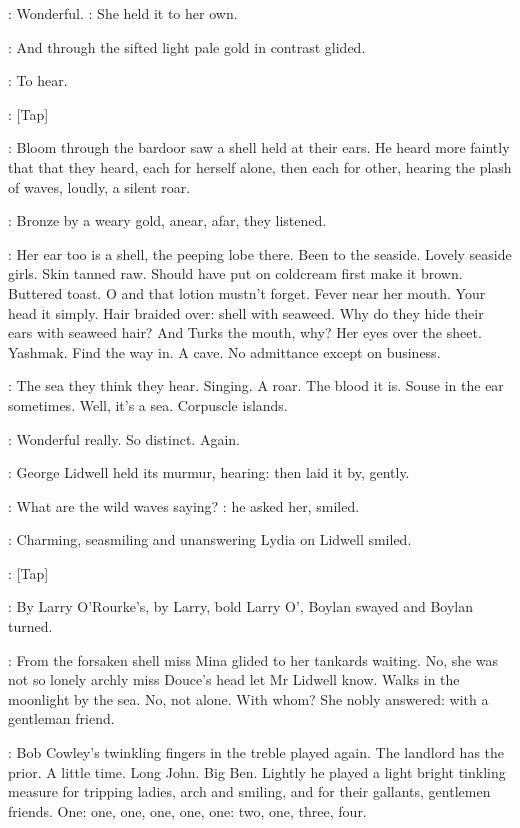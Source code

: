 \lidwell:
Wonderful.
:
She held it to her own.

:
And through the sifted light pale gold
in contrast glided.

\BloomInt:
To hear.

\stripling:
[Tap]

:
Bloom through the bardoor saw a shell held at their ears.
He heard
more faintly that that they heard,
each for herself alone,
then each for
other,
hearing the plash of waves,
loudly,
a silent roar.

:
Bronze by a weary gold,
anear,
afar,
they listened.

\BloomInt:
Her ear too is a shell,
the peeping lobe there.
Been to the seaside.
Lovely seaside girls.
Skin tanned raw.
Should have put on coldcream first
make it brown.
Buttered toast.
O and that lotion mustn't forget.
Fever
near her mouth.
Your head it simply.
Hair braided over:
shell with
seaweed.
Why do they hide their ears with seaweed hair?
And Turks the
mouth,
why?
Her eyes over the sheet.
Yashmak.
Find the way in.
A cave.
No
admittance except on business.

\BloomInt:
The sea they think they hear.
Singing.
A roar.
The blood it is.
Souse
in the ear sometimes.
Well,
it's a sea.
Corpuscle islands.

\lidwell:
Wonderful really.
So distinct.
Again.

:
George Lidwell held its murmur,
hearing:
then laid it by,
gently.

\lidwell:
What are the wild waves saying?
:
he asked her,
smiled.

:
Charming,
seasmiling and unanswering
Lydia on Lidwell smiled.

\stripling:
[Tap]

:
By Larry O'Rourke's,
by Larry,
bold Larry O',
Boylan swayed and
Boylan turned.

:
From the forsaken shell miss Mina glided to her tankards waiting.
No,
she was not so lonely archly miss Douce's head let Mr Lidwell know.
Walks in the moonlight by the sea.
No,
not alone.
With whom?
She nobly
answered:
with a gentleman friend.

:
Bob Cowley's twinkling fingers in the treble played again.
The
landlord has the prior.
A little time.
Long John.
Big Ben.
Lightly he
played a light bright tinkling measure for tripping ladies,
arch and
smiling,
and for their gallants,
gentlemen friends.
One:
one,
one,
one,
one,
one:
two,
one,
three,
four.

